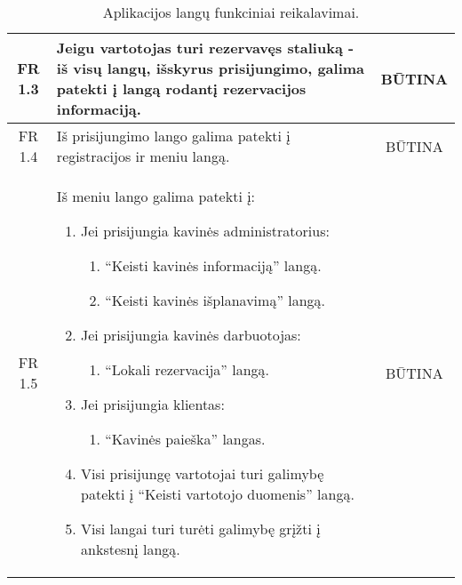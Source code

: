 \documentclass{VUMIFPSkursinis}
\begin{document}
\begin{center}
\begin{table}[H]
\begin{tabular}{|p{2cm}|p{}|p{}|}
		\multicolumn{1}{|c|}{FR 1.3}&
		{Jeigu vartotojas turi rezervavęs staliuką - iš visų langų, išskyrus \newline prisijungimo, galima patekti į langą rodantį rezervacijos informaciją.}&
		\multicolumn{1}{|c|}{BŪTINA}\\
	\hline
		\multicolumn{1}{|c|}{FR 1.4}&
		{Iš prisijungimo lango galima patekti į registracijos ir meniu langą.}&
		\multicolumn{1}{|c|}{BŪTINA}\\
	\hline
		\multicolumn{1}{|c|}{FR 1.5}&
		{Iš meniu lango galima patekti į:\newline
		\begin{enumerate}
			\item Jei prisijungia kavinės administratorius:
				\begin{enumerate}
					\item “Keisti kavinės informaciją” langą.
					\item “Keisti kavinės išplanavimą” langą.
				\end{enumerate}
			\item Jei prisijungia kavinės darbuotojas:
				\begin{enumerate}
					\item “Lokali rezervacija” langą.
				\end{enumerate}
			\item Jei prisijungia klientas:
				\begin{enumerate}
					\item “Kavinės paieška” langas.
				\end{enumerate}
			\item Visi prisijungę vartotojai turi galimybę patekti į “Keisti vartotojo duomenis” langą.
			\item Visi langai turi turėti galimybę grįžti į ankstesnį langą.
		\end{enumerate}
		}&
		\multicolumn{1}{|c|}{BŪTINA}\\		
	\hline
	
	\end{tabular}
	\caption{Aplikacijos langų funkciniai reikalavimai.}
	\label{table:AplikacijosLangai}
	\end{table}
	
\end{center}

\pagebreak
\end{document}
